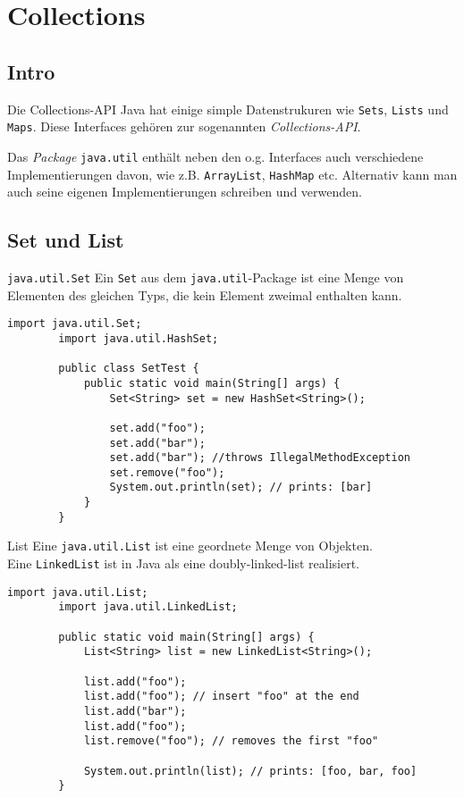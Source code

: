 \section{Collections}
\subsection{Intro}
\begin{frame}{Die Collections-API}
    Java hat einige simple Datenstrukuren wie \texttt{Sets}, \texttt{Lists} und \texttt{Maps}.
    Diese Interfaces gehören zur sogenannten \textit{Collections-API}.

    Das \textit{Package} \texttt{java.util} enthält neben den o.g. Interfaces auch verschiedene Implementierungen davon,
    wie z.B. \texttt{ArrayList}, \texttt{HashMap} etc.
    Alternativ kann man auch seine eigenen Implementierungen schreiben und verwenden.
\end{frame}

\subsection{Set und List}
\begin{frame}[fragile]{\texttt{java.util.Set}}
    Ein \texttt{Set} aus dem \texttt{java.util}-Package ist eine Menge von Elementen des gleichen Typs, die kein Element zweimal enthalten kann.
    \begin{lstlisting}[gobble=8]
        import java.util.Set;
        import java.util.HashSet;

        public class SetTest {
            public static void main(String[] args) {
                Set<String> set = new HashSet<String>();

                set.add("foo");
                set.add("bar");
                set.add("bar"); //throws IllegalMethodException
                set.remove("foo");
                System.out.println(set); // prints: [bar]
            }
        }
    \end{lstlisting}
\end{frame}

\begin{frame}[fragile]{List}
    Eine \texttt{java.util.List} ist eine geordnete Menge von Objekten. \\
    Eine \texttt{LinkedList} ist in Java als eine doubly-linked-list realisiert.
    \begin{lstlisting}[gobble=8]
        import java.util.List;
        import java.util.LinkedList;

        public static void main(String[] args) {
            List<String> list = new LinkedList<String>();

            list.add("foo");
            list.add("foo"); // insert "foo" at the end
            list.add("bar");
            list.add("foo");
            list.remove("foo"); // removes the first "foo"

            System.out.println(list); // prints: [foo, bar, foo]
        }
    \end{lstlisting}
\end{frame}

